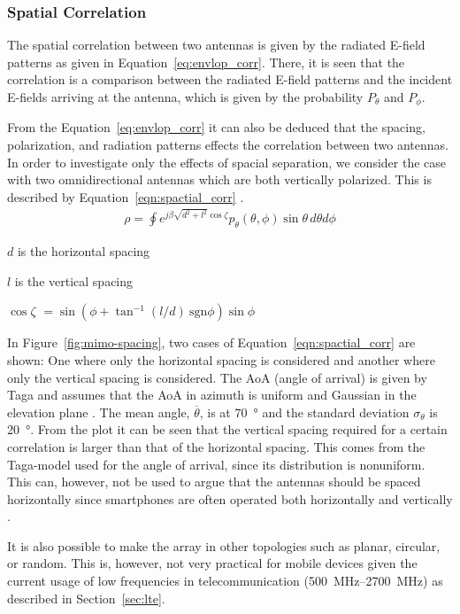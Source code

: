 \subsubsection{Spatial Correlation}
The spatial correlation between two antennas is given by the radiated E-field patterns as given in Equation~\ref{eq:envlop_corr}. There, it is seen that the correlation is a comparison between the radiated E-field patterns and the incident E-fields arriving at the antenna, which is given by the probability $P_\theta$ and $P_\phi$.

From the Equation~\ref{eq:envlop_corr} it can also be deduced that the spacing, polarization, and radiation patterns effects the correlation between two antennas. In order to investigate only the effects of spacial separation, we consider the case with two omnidirectional antennas which are both vertically polarized. This is described by Equation~\ref{eqn:spactial_corr} \cite{Tim2012Practical}.
\begin{align} %
\label{eqn:spactial_corr}
  \rho = \oint e^{j\beta \sqrt{d^2+l^2}\cos\zeta}p_\theta(\theta,\phi)\sin\theta \, d \theta d \phi
\end{align}
\begin{where}
\item[$d$] is the horizontal spacing
\item[$l$] is the vertical spacing
\item[$\cos \zeta$] $= \sin(\phi + \tan^{-1}(l/d)\ \text{sgn}\phi)\sin\phi$   
\end{where}

In Figure~\ref{fig:mimo-spacing}, two cases of Equation~\ref{eqn:spactial_corr} are shown: One where only the horizontal spacing is considered and another where only the vertical spacing is considered. The AoA (angle of arrival) is given by Taga and assumes that the AoA in azimuth is uniform and Gaussian in the elevation plane \cite{Tim2012Practical}. The mean angle, $\overline{\theta}$, is at \SI{70}{\degree} and the standard deviation $\sigma_\theta$ is \SI{20}{\degree}. From the plot it can be seen that the vertical spacing required for a certain correlation is larger than that of the horizontal spacing. This comes from the Taga-model used for the angle of arrival, since its distribution is nonuniform. This can, however, not be used to argue that the antennas should be spaced horizontally since smartphones are often operated both horizontally and vertically \cite{Tim2012Practical}. 

It is also possible to make the array in other topologies such as planar, circular, or random. This is, however, not very practical for mobile devices given the current usage of low frequencies in telecommunication (\SIrange{500}{2700}{MHz}) as described in Section~\ref{sec:lte}.

